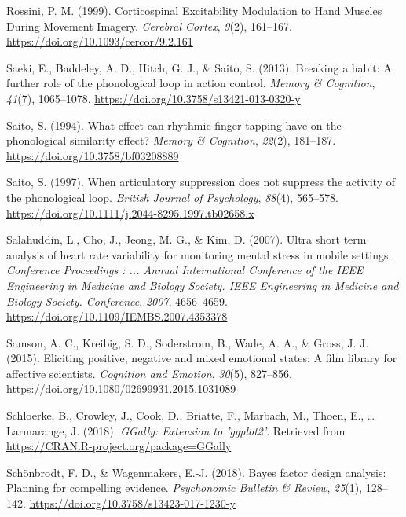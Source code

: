 \documentclass[a4paper,12pt,twoside,openright,oldfontcommands]{memoir}
\begin{document}
\leavevmode\hypertarget{ref-rossini_corticospinal_1999}{}%
Rossini, P. M. (1999). Corticospinal Excitability Modulation to Hand Muscles During Movement Imagery. \emph{Cerebral Cortex}, \emph{9}(2), 161--167. \url{https://doi.org/10.1093/cercor/9.2.161}

\leavevmode\hypertarget{ref-saeki_breaking_2013}{}%
Saeki, E., Baddeley, A. D., Hitch, G. J., \& Saito, S. (2013). Breaking a habit: A further role of the phonological loop in action control. \emph{Memory \& Cognition}, \emph{41}(7), 1065--1078. \url{https://doi.org/10.3758/s13421-013-0320-y}

\leavevmode\hypertarget{ref-saito_what_1994}{}%
Saito, S. (1994). What effect can rhythmic finger tapping have on the phonological similarity effect? \emph{Memory \& Cognition}, \emph{22}(2), 181--187. \url{https://doi.org/10.3758/bf03208889}

\leavevmode\hypertarget{ref-saito_when_1997}{}%
Saito, S. (1997). When articulatory suppression does not suppress the activity of the phonological loop. \emph{British Journal of Psychology}, \emph{88}(4), 565--578. \url{https://doi.org/10.1111/j.2044-8295.1997.tb02658.x}

\leavevmode\hypertarget{ref-Salahuddin2007}{}%
Salahuddin, L., Cho, J., Jeong, M. G., \& Kim, D. (2007). Ultra short term analysis of heart rate variability for monitoring mental stress in mobile settings. \emph{Conference Proceedings : ... Annual International Conference of the IEEE Engineering in Medicine and Biology Society. IEEE Engineering in Medicine and Biology Society. Conference}, \emph{2007}, 4656--4659. \url{https://doi.org/10.1109/IEMBS.2007.4353378}

\leavevmode\hypertarget{ref-samson_eliciting_2015}{}%
Samson, A. C., Kreibig, S. D., Soderstrom, B., Wade, A. A., \& Gross, J. J. (2015). Eliciting positive, negative and mixed emotional states: A film library for affective scientists. \emph{Cognition and Emotion}, \emph{30}(5), 827--856. \url{https://doi.org/10.1080/02699931.2015.1031089}

\leavevmode\hypertarget{ref-R-GGally}{}%
Schloerke, B., Crowley, J., Cook, D., Briatte, F., Marbach, M., Thoen, E., \ldots{} Larmarange, J. (2018). \emph{GGally: Extension to 'ggplot2'}. Retrieved from \url{https://CRAN.R-project.org/package=GGally}

\leavevmode\hypertarget{ref-schonbrodt_bayes_2018}{}%
Schönbrodt, F. D., \& Wagenmakers, E.-J. (2018). Bayes factor design analysis: Planning for compelling evidence. \emph{Psychonomic Bulletin \& Review}, \emph{25}(1), 128--142. \url{https://doi.org/10.3758/s13423-017-1230-y}
\end{document}
